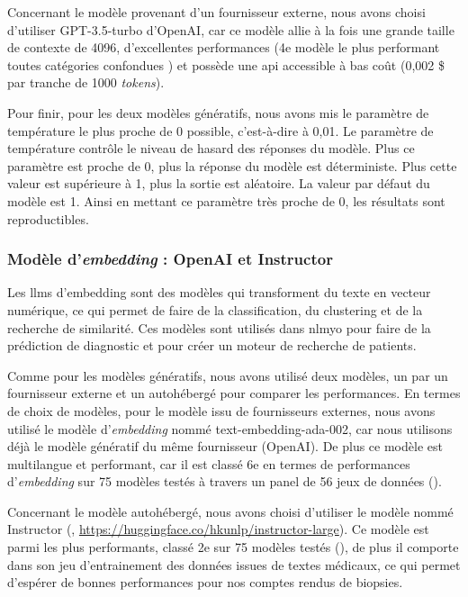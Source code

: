 Concernant le modèle provenant d'un fournisseur externe, nous avons choisi d'utiliser GPT-3.5-turbo d'OpenAI, car ce modèle allie à la fois une  grande taille de contexte de 4096, d'excellentes performances (4e modèle le plus performant toutes catégories confondues \cite{lianmin_zheng_chatbot_2023}) et possède une \gls{api} accessible à bas coût (0,002 \$ par tranche de 1000 \textit{tokens}).

Pour finir, pour les deux modèles génératifs, nous avons mis le paramètre de température le plus proche de 0 possible, c'est-à-dire à 0,01. Le paramètre de température contrôle le niveau de hasard des réponses du modèle. Plus ce paramètre est proche de 0, plus la réponse du modèle est déterministe. Plus cette valeur est supérieure à 1, plus la sortie est aléatoire. La valeur par défaut du modèle est 1. Ainsi en mettant ce paramètre très proche de 0, les résultats sont reproductibles. 

\subsubsection{Modèle d'\textit{embedding} : OpenAI et Instructor}
Les \gls{llms} d'embedding sont des modèles qui transforment du texte en vecteur numérique, ce qui permet de faire de la classification, du clustering et de la recherche de similarité. Ces modèles sont utilisés dans \gls{nlmyo} pour faire de la prédiction de diagnostic et pour créer un moteur de recherche de patients.

Comme pour les modèles  génératifs, nous avons utilisé deux modèles, un par un fournisseur externe et un autohébergé pour comparer les performances. En termes de choix de modèles, pour le modèle issu de fournisseurs externes, nous avons utilisé le modèle d'\textit{embedding} nommé text-embedding-ada-002, car nous utilisons déjà le modèle génératif du même fournisseur (OpenAI). De plus ce modèle est multilangue et performant, car il est classé 6e en termes de performances d'\textit{embedding} sur 75 modèles testés à travers un panel de 56 jeux de données (\cite{muennighoff_mteb_2022}).

Concernant le modèle autohébergé, nous avons choisi d'utiliser le modèle nommé Instructor (\cite{su_one_2023}, \url{https://huggingface.co/hkunlp/instructor-large}). Ce modèle est parmi les plus performants, classé 2e sur 75 modèles testés (\cite{muennighoff_mteb_2022}), de plus il comporte dans son jeu d'entrainement des données issues de textes médicaux, ce qui permet d'espérer de bonnes performances pour nos comptes rendus de biopsies. 

